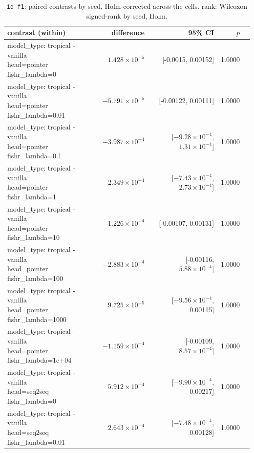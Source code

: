 \documentclass[10pt]{article}
\makeatletter
\newcommand{\stackcell}[1]{\begin{tabular}[t]{@{}l@{}}#1\end{tabular}}
\makeatother
\begin{document}
{\small
\begin{longtable}{lrrrl}
\caption{\texttt{id\_f1}: paired contrasts by seed, Holm-corrected across the cells. rank: Wilcoxon signed-rank by seed, Holm.}\label{tab:paired-id_f1}\\
\toprule
contrast (within) & difference & 95\% CI & $p$ & \\
\midrule
\endhead
\stackcell{model\_type: tropical - vanilla\\\footnotesize head=pointer fishr\_lambda=0 } & $1.428\times10^{-5}$ & [-0.0015, 0.00152] & 1.0000 & \\
\stackcell{model\_type: tropical - vanilla\\\footnotesize head=pointer fishr\_lambda=0.01 } & $-5.791\times10^{-5}$ & [-0.00122, 0.00111] & 1.0000 & \\
\stackcell{model\_type: tropical - vanilla\\\footnotesize head=pointer fishr\_lambda=0.1 } & $-3.987\times10^{-4}$ & [$-9.28\times10^{-4}$, $1.31\times10^{-4}$] & 1.0000 & \\
\stackcell{model\_type: tropical - vanilla\\\footnotesize head=pointer fishr\_lambda=1 } & $-2.349\times10^{-4}$ & [$-7.43\times10^{-4}$, $2.73\times10^{-4}$] & 1.0000 & \\
\stackcell{model\_type: tropical - vanilla\\\footnotesize head=pointer fishr\_lambda=10 } & $1.226\times10^{-4}$ & [-0.00107, 0.00131] & 1.0000 & \\
\stackcell{model\_type: tropical - vanilla\\\footnotesize head=pointer fishr\_lambda=100 } & $-2.883\times10^{-4}$ & [-0.00116, $5.88\times10^{-4}$] & 1.0000 & \\
\stackcell{model\_type: tropical - vanilla\\\footnotesize head=pointer fishr\_lambda=1000 } & $9.725\times10^{-5}$ & [$-9.56\times10^{-4}$, 0.00115] & 1.0000 & \\
\stackcell{model\_type: tropical - vanilla\\\footnotesize head=pointer fishr\_lambda=1e+04 } & $-1.159\times10^{-4}$ & [-0.00109, $8.57\times10^{-4}$] & 1.0000 & \\
\stackcell{model\_type: tropical - vanilla\\\footnotesize head=seq2seq fishr\_lambda=0 } & $5.912\times10^{-4}$ & [$-9.90\times10^{-4}$, 0.00217] & 1.0000 & \\
\stackcell{model\_type: tropical - vanilla\\\footnotesize head=seq2seq fishr\_lambda=0.01 } & $2.643\times10^{-4}$ & [$-7.48\times10^{-4}$, 0.00128] & 1.0000 & \\

\end{longtable}}
\end{document}
